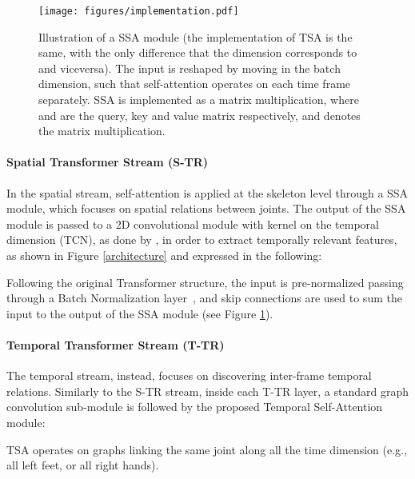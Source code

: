 \documentclass[review]{cvpr}
\begin{document}
\begin{figure}
    \begin{center}
    \texttt{[image: figures/implementation.pdf]}
    \end{center}
    \caption{Illustration of a SSA module (the implementation of TSA is the same, with the only difference that the dimension  corresponds to  and viceversa). The input  is reshaped by moving  in the batch dimension, such that self-attention operates on each time frame separately. SSA is implemented as a matrix multiplication, where  and  are the query, key and value matrix respectively, and  denotes the matrix multiplication. }
    \label{implementation}
\end{figure}


\paragraph*{\textbf{Spatial Transformer Stream (S-TR)}} In the spatial stream, self-attention is applied at the skeleton level through a SSA module, which focuses on spatial relations between joints. The output of the SSA module is passed to a 2D convolutional module with kernel  on the temporal dimension (TCN), as done by \cite{yan2018spatial}, in order to extract temporally relevant features, as shown in Figure \ref{architecture} and expressed in the following: 

Following the original Transformer structure, the input is pre-normalized passing through a Batch Normalization layer~\cite{ioffe2015batch, bn_tr}, and skip connections are used to sum the input to the output of the SSA module (see Figure \ref{implementation}).


\paragraph*{\textbf{Temporal Transformer Stream (T-TR)}} 
The temporal stream, instead, focuses on discovering inter-frame temporal relations. Similarly to the S-TR stream, inside each T-TR layer, a standard graph convolution sub-module \cite{yan2018spatial} is followed by the proposed Temporal Self-Attention module:

TSA operates on graphs linking the same joint along all the time dimension (e.g., all left feet, or all right hands).
\end{document}
